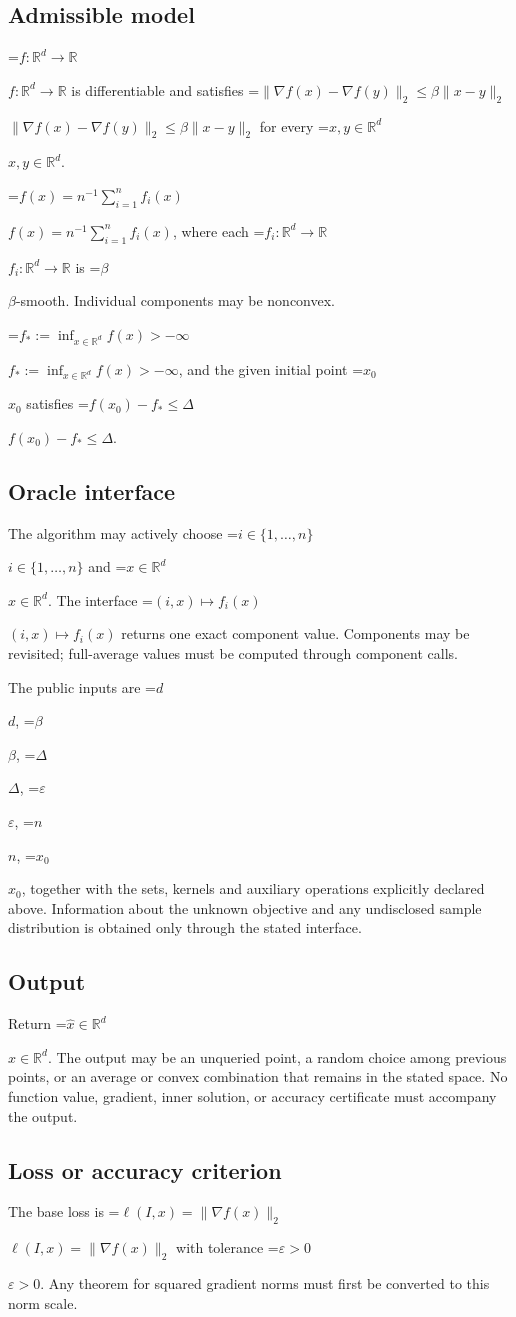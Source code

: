 \documentclass[10pt,a4paper]{article}
\newcommand{\AtlasMath}[1]{\par\begingroup\centering\setbox0=\hbox{$\displaystyle #1$}\ifdim\wd0>1.4\linewidth\typeout{ATLAS WIDE FORMULA: \the\wd0}\fi\ifdim\wd0>\linewidth\resizebox{\linewidth}{!}{\box0}\else\box0\fi\par\endgroup}
\newcommand{\AtlasInlineMath}[1]{\begingroup\setbox0=\hbox{$#1$}\ifdim\wd0>.4\linewidth\endgroup\AtlasMath{#1}\else\endgroup$#1$\fi}
\begin{document}
\subsection{Admissible model}
\AtlasInlineMath{f:\mathbb{R}^d\to\mathbb{R}} is differentiable and satisfies \AtlasInlineMath{\|\nabla f(x)-\nabla f(y)\|_2\le\beta\|x-y\|_2} for every \AtlasInlineMath{x,y\in\mathbb{R}^d}.

\AtlasInlineMath{f(x)=n^{-1}\sum_{i=1}^n f_i(x)}, where each \AtlasInlineMath{f_i:\mathbb{R}^d\to\mathbb{R}} is \AtlasInlineMath{\beta}-smooth. Individual components may be nonconvex.

\AtlasInlineMath{f_*:=\inf_{x\in\mathbb{R}^d}f(x)>-\infty}, and the given initial point \AtlasInlineMath{x_0} satisfies \AtlasInlineMath{f(x_0)-f_*\le\Delta}.

\subsection{Oracle interface}
The algorithm may actively choose \AtlasInlineMath{i\in\{1,\ldots,n\}} and \AtlasInlineMath{x\in\mathbb{R}^d}. The interface \AtlasInlineMath{(i,x)\mapsto f_i(x)} returns one exact component value. Components may be revisited; full-average values must be computed through component calls.

The public inputs are \AtlasInlineMath{d}, \AtlasInlineMath{\beta}, \AtlasInlineMath{\Delta}, \AtlasInlineMath{\varepsilon}, \AtlasInlineMath{n}, \AtlasInlineMath{x_0}, together with the sets, kernels and auxiliary operations explicitly declared above. Information about the unknown objective and any undisclosed sample distribution is obtained only through the stated interface.

\subsection{Output}
Return \AtlasInlineMath{\widehat{x}\in \mathbb{R}^d}. The output may be an unqueried point, a random choice among previous points, or an average or convex combination that remains in the stated space. No function value, gradient, inner solution, or accuracy certificate must accompany the output.

\subsection{Loss or accuracy criterion}
The base loss is \AtlasInlineMath{\ell(I,x)=\|\nabla f(x)\|_2} with tolerance \AtlasInlineMath{\varepsilon>0}. Any theorem for squared gradient norms must first be converted to this norm scale.
\end{document}
